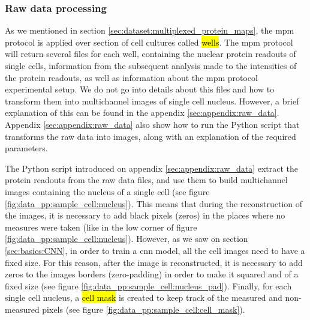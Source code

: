 \subsubsection{Raw data processing}

As we mentioned in section \ref{sec:dataset:multiplexed_protein_maps}, the \gls{mpm} protocol is applied over section of cell cultures called \hl{wells}. The \gls{mpm} protocol will return several files for each well, containing the nuclear protein readouts of single cells, information from the subsequent analysis made to the intensities of the protein readouts, as well as information about the \gls{mpm} protocol experimental setup. We do not go into details about this files and how to transform them into multichannel images of single cell nucleus. However, a brief explanation of this can be found in the appendix \ref{sec:appendix:raw_data}. Appendix \ref{sec:appendix:raw_data} also show how to run the Python script that transforms the raw data into images, along with an explanation of the required parameters.

The Python script introduced on appendix \ref{sec:appendix:raw_data} extract the protein readouts from the raw data files, and use them to build multichannel images containing the nucleus of a single cell (see figure \ref{fig:data_pp:sample_cell:nucleus}). This means that during the reconstruction of the images, it is necessary to add black pixels (zeros) in the places where no measures were taken (like in the low corner of figure \ref{fig:data_pp:sample_cell:nucleus}). However, as we saw on section \ref{sec:basics:CNN}, in order to train a \gls{cnn} model, all the cell images need to have a fixed size. For this reason, after the image is reconstructed, it is necessary to add zeros to the images borders (zero-padding) in order to make it squared and of a fixed size (see figure \ref{fig:data_pp:sample_cell:nucleus_pad}). Finally, for each single cell nucleus, a \hl{cell mask} is created to keep track of the measured and non-measured pixels (see figure \ref{fig:data_pp:sample_cell:cell_mask}).

